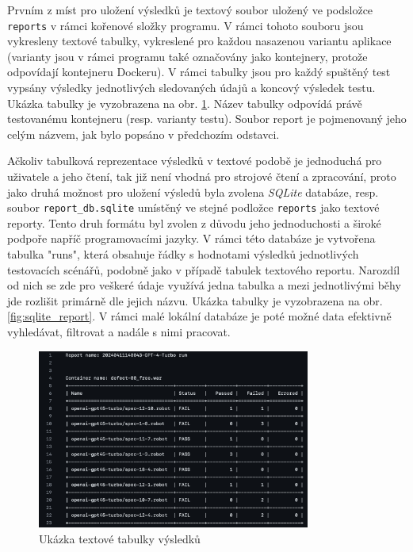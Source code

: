 \documentclass[czech, ma, kiv, he, iso690numb, pdf, viewonly]{fasthesis}
\begin{document}
    Prvním z míst pro uložení výsledků je textový soubor uložený ve podsložce \verb|reports| v rámci kořenové složky programu. V rámci tohoto souboru jsou vykresleny textové tabulky, vykreslené pro každou nasazenou variantu aplikace (varianty jsou v rámci programu také označovány jako kontejnery, protože odpovídají kontejneru Dockeru). V rámci tabulky jsou pro každý spuštěný test vypsány výsledky jednotlivých sledovaných údajů a koncový výsledek testu. Ukázka tabulky je vyzobrazena na obr. \ref{fig:report_table}. Název tabulky odpovídá právě testovanému kontejneru (resp. varianty testu). Soubor report je pojmenovaný jeho celým názvem, jak bylo popsáno v předchozím odstavci.

    Ačkoliv tabulková reprezentace výsledků v textové podobě je jednoduchá pro uživatele a jeho čtení, tak již není vhodná pro strojové čtení a zpracování, proto jako druhá možnost pro uložení výsledů byla zvolena \textit{SQLite} databáze, resp. soubor \verb|report_db.sqlite| umístěný ve stejné podložce \verb|reports| jako textové reporty. Tento druh formátu byl zvolen z důvodu jeho jednoduchosti a široké podpoře napříč programovacími jazyky. V rámci této databáze je vytvořena tabulka "runs", která obsahuje řádky s hodnotami výsledků jednotlivých testovacích scénářů, podobně jako v případě tabulek textového reportu. Narozdíl od nich se zde pro veškeré údaje využívá jedna tabulka a mezi jednotlivými běhy jde rozlišit primárně dle jejich názvu. Ukázka tabulky je vyzobrazena na obr. \ref{fig:sqlite_report}. V rámci malé lokální databáze je poté možné data efektivně vyhledávat, filtrovat a nadále s nimi pracovat.
   
    \begin{figure}
        \includegraphics[width=0.8\textwidth]{pic/report_table.png}
        \centering
        \caption{Ukázka textové tabulky výsledků}
        \label{fig:report_table}
    \end{figure}
\end{document}
